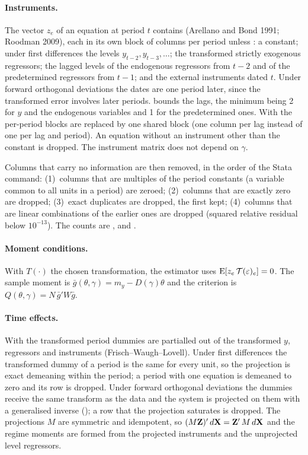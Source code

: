 \documentclass[
  10.5pt,
  a4paper,
]{article}
\begin{document}
\paragraph{Instruments.} The vector $z_e$ of an equation at period $t$ contains (Arellano and Bond 1991;
Roodman 2009), each in its own block of columns per period unless :
a constant; under first differences the levels $y_{t-2},y_{t-3},\dots$; the transformed strictly
exogenous regressors; the lagged levels of the endogenous regressors from $t-2$ and of the
predetermined regressors from $t-1$; and the external instruments dated $t$. Under forward
orthogonal deviations the dates are one period later, since the transformed error involves later
periods.  bounds the lags, the minimum being 2 for $y$ and the endogenous
variables and 1 for the predetermined ones. With  the per-period blocks are replaced
by one shared block (one column per lag instead of one per lag and period). An equation without an
instrument other than the constant is dropped. The instrument matrix does not depend on $\gamma$.

Columns that carry no information are then removed, in the order of the Stata command:
(1)~columns that are multiples of the period constants (a variable common to all units in a period)
are zeroed; (2)~columns that are exactly zero are dropped; (3)~exact duplicates are dropped, the
first kept; (4)~columns that are linear combinations of the earlier ones are dropped (squared
relative residual below $10^{-13}$). The counts are ,  and
.

\paragraph{Moment conditions.} With $T(\cdot)$ the chosen transformation, the estimator uses
$\operatorname{E}[z_e\,\mathcal T(\varepsilon)_e]=0$. The sample moment is
$\bar g(\theta,\gamma)=m_y-D(\gamma)\theta$ and the criterion is
$Q(\theta,\gamma)=N\,\bar g'W\bar g$.

\paragraph{Time effects.} With  the transformed period dummies are partialled out of the
transformed $y$, regressors and instruments (Frisch--Waugh--Lovell). Under first differences the
transformed dummy of a period is the same for every unit, so the projection is exact demeaning within
the period; a period with one equation is demeaned to zero and its row is dropped. Under forward
orthogonal deviations the dummies receive the same transform as the data and the system is projected
on them with a generalised inverse (); a row that the projection saturates is dropped.
The projections $M$ are symmetric and idempotent, so $(M\mathbf{Z})'\,d\mathbf{X}=\mathbf{Z}'\,M\,d\mathbf{X}$ and the regime
moments are formed from the projected instruments and the unprojected level regressors.
\end{document}
